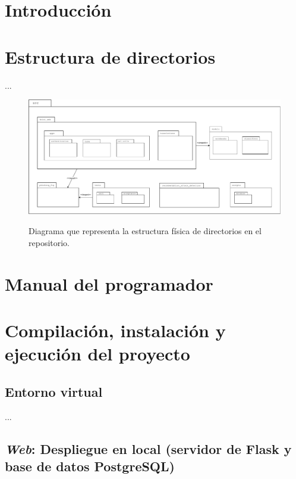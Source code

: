 
\section{Introducción}

\section{Estructura de directorios}

...

\begin{figure}[h]
	\caption[Diagrama: estructura de directorios]{Diagrama que representa la estructura física de directorios en el repositorio.}
	\centering
	\includegraphics[width=\textwidth]{../img/anexos/diagrams/repo-structure}
	\label{d:diag-repo-structure}
\end{figure}

\section{Manual del programador}

\section{Compilación, instalación y ejecución del proyecto}

\subsection{Entorno virtual}
...

\subsection{\textit{Web}: Despliegue en local (servidor de Flask y base de datos PostgreSQL)}

